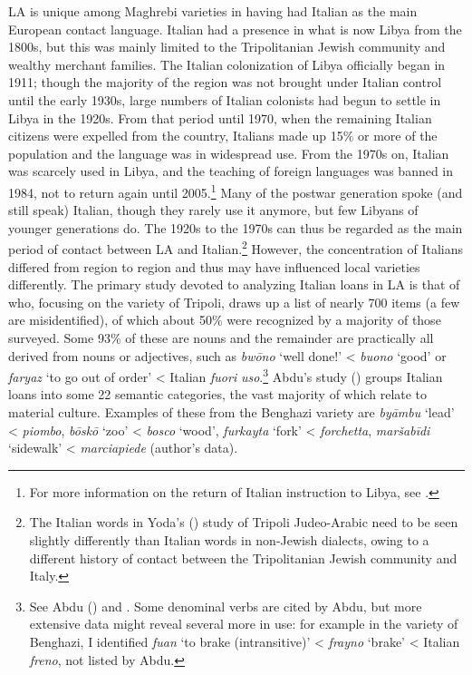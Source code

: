 \documentclass[output=paper]{langsci/langscibook}
\begin{document}
  LA is unique among Maghrebi varieties in having had Italian as the main European contact language. Italian had a presence in what is now Libya from the 1800s, but this was mainly limited to the Tripolitanian Jewish community and wealthy merchant families. The Italian colonization of Libya officially began in 1911; though the majority of the region was not brought under Italian control until the early 1930s, large numbers of Italian colonists had begun to settle in Libya in the 1920s. From that period until 1970, when the remaining Italian citizens were expelled from the country, Italians made up 15\% or more of the population and the language was in widespread use. From the 1970s on, Italian was scarcely used in Libya, and the teaching of foreign languages was banned in 1984, not to return again until 2005.\footnote{For more information on the return of Italian instruction to Libya, see \citet{Danna2018phonetic}.} Many of the postwar generation spoke (and still speak) Italian, though they rarely use it anymore, but few Libyans of younger generations do. The 1920s to the 1970s can thus be regarded as the main period of contact between LA and Italian.\footnote{The Italian words in Yoda’s (\citeyear{Yoda2005}) study of Tripoli Judeo-Arabic need to be seen slightly differently than Italian words in non-Jewish dialects, owing to a different history of contact between the Tripolitanian Jewish community and Italy.} However, the concentration of Italians differed from region to region and thus may have influenced local varieties differently. The primary study devoted to analyzing Italian loans in LA is that of \citet{Abdu1988} who, focusing on the variety of Tripoli, draws up a list of nearly 700 items (a few are misidentified), of which about 50\% were recognized by a majority of those surveyed. Some 93\% of these are nouns and the remainder are practically all derived from nouns or adjectives, such as \textit{bwōno} ‘well done!’ < \textit{buono} ‘good’ or \textit{faryaz} ‘to go out of order’ < Italian \textit{fuori} \textit{uso}.\footnote{See Abdu (\citeyear[271]{Abdu1988}) and \citet{Danna2018phonetic}. Some denominal verbs are cited by Abdu, but more extensive data might reveal several more in use: for example in the variety of Benghazi, I identified \textit{fu{\R}an}  ‘to brake (intransitive)’ < \textit{frayno} ‘brake’ < Italian \textit{freno}, not listed by Abdu.} Abdu’s study (\citeyear[248–268]{Abdu1988}) groups Italian loans into some 22 semantic categories, the vast majority of which relate to material culture. Examples of these from the Benghazi variety are \textit{byāmbu} ‘lead’ < \textit{piombo}, \textit{bōskō} ‘zoo’ < \textit{bosco} `wood', \textit{furkayta} ‘fork’ < \textit{forchetta}, \textit{maršabīdi} ‘sidewalk’ < \textit{marciapiede} (author’s data).
\end{document}
